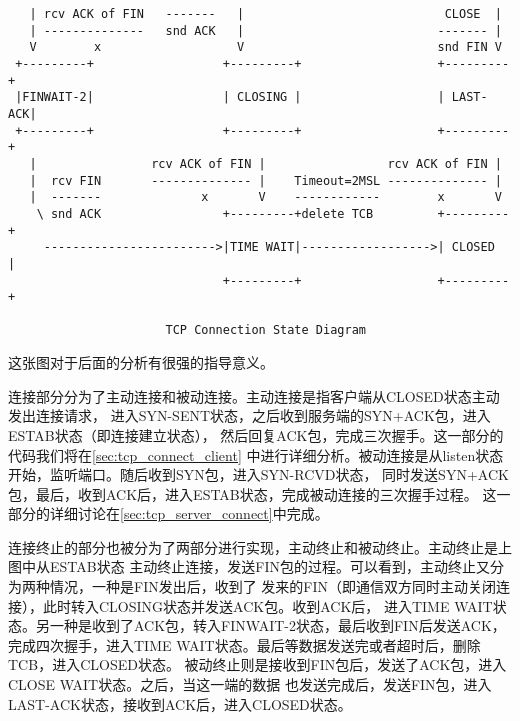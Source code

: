 \begin{verbatim}
   | rcv ACK of FIN   -------   |                            CLOSE  |  
   | --------------   snd ACK   |                           ------- |  
   V        x                   V                           snd FIN V  
 +---------+                  +---------+                   +---------+
 |FINWAIT-2|                  | CLOSING |                   | LAST-ACK|
 +---------+                  +---------+                   +---------+
   |                rcv ACK of FIN |                 rcv ACK of FIN |  
   |  rcv FIN       -------------- |    Timeout=2MSL -------------- |  
   |  -------              x       V    ------------        x       V  
    \ snd ACK                 +---------+delete TCB         +---------+
     ------------------------>|TIME WAIT|------------------>| CLOSED  |
                              +---------+                   +---------+

                      TCP Connection State Diagram
\end{verbatim}
这张图对于后面的分析有很强的指导意义。

连接部分分为了主动连接和被动连接。主动连接是指客户端从CLOSED状态主动发出连接请求，
进入SYN-SENT状态，之后收到服务端的SYN+ACK包，进入ESTAB状态（即连接建立状态），
然后回复ACK包，完成三次握手。这一部分的代码我们将在\ref{sec:tcp_connect_client}
中进行详细分析。被动连接是从listen状态开始，监听端口。随后收到SYN包，进入SYN-RCVD状态，
同时发送SYN+ACK包，最后，收到ACK后，进入ESTAB状态，完成被动连接的三次握手过程。
这一部分的详细讨论在\ref{sec:tcp_server_connect}中完成。

连接终止的部分也被分为了两部分进行实现，主动终止和被动终止。主动终止是上图中从ESTAB状态
主动终止连接，发送FIN包的过程。可以看到，主动终止又分为两种情况，一种是FIN发出后，收到了
发来的FIN（即通信双方同时主动关闭连接），此时转入CLOSING状态并发送ACK包。收到ACK后，
进入TIME WAIT状态。另一种是收到了ACK包，转入FINWAIT-2状态，最后收到FIN后发送ACK，
完成四次握手，进入TIME WAIT状态。最后等数据发送完或者超时后，删除TCB，进入CLOSED状态。
被动终止则是接收到FIN包后，发送了ACK包，进入CLOSE WAIT状态。之后，当这一端的数据
也发送完成后，发送FIN包，进入LAST-ACK状态，接收到ACK后，进入CLOSED状态。

